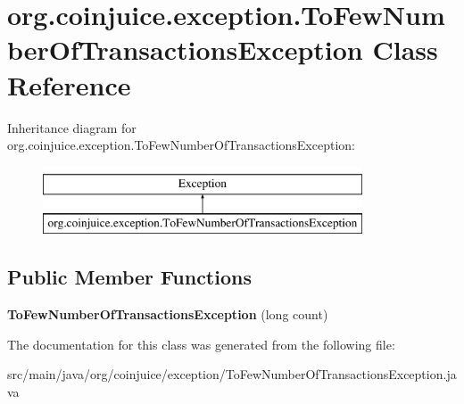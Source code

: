 \hypertarget{classorg_1_1coinjuice_1_1exception_1_1_to_few_number_of_transactions_exception}{\section{org.\-coinjuice.\-exception.\-To\-Few\-Number\-Of\-Transactions\-Exception Class Reference}
\label{classorg_1_1coinjuice_1_1exception_1_1_to_few_number_of_transactions_exception}
}
Inheritance diagram for org.\-coinjuice.\-exception.\-To\-Few\-Number\-Of\-Transactions\-Exception\-:\begin{figure}[H]
\begin{center}
\leavevmode
\includegraphics[height=2.000000cm]{classorg_1_1coinjuice_1_1exception_1_1_to_few_number_of_transactions_exception}
\end{center}
\end{figure}
\subsection*{Public Member Functions}
\begin{DoxyCompactItemize}
\item 
\hypertarget{classorg_1_1coinjuice_1_1exception_1_1_to_few_number_of_transactions_exception_a6a39f6bf0bd1343fd94368053aa9a20b}{{\bfseries To\-Few\-Number\-Of\-Transactions\-Exception} (long count)}\label{classorg_1_1coinjuice_1_1exception_1_1_to_few_number_of_transactions_exception_a6a39f6bf0bd1343fd94368053aa9a20b}

\end{DoxyCompactItemize}


The documentation for this class was generated from the following file\-:\begin{DoxyCompactItemize}
\item 
src/main/java/org/coinjuice/exception/To\-Few\-Number\-Of\-Transactions\-Exception.\-java\end{DoxyCompactItemize}
